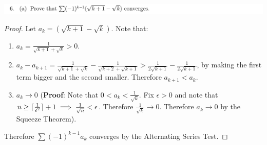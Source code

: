 \documentclass[12pt]{article}
\begin{document}
\newpage
\subsection{}
\begin{mdframed}
\includegraphics[width=400pt]{img/analysis--oxford-M2-I-5-6-a.png}
\end{mdframed}

\begin{proof}
  Let $a_k = (\sqrt{k+1} - \sqrt{k})$. Note that:

  \begin{enumerate}[label=(\roman*)]
  \item $a_k = \frac{1}{\sqrt{k+1} + \sqrt{k}} > 0$.
  \item
    $a_k - a_{k+1} = \frac{1}{\sqrt{k+1} + \sqrt{k}} - \frac{1}{\sqrt{k+2} + \sqrt{k + 1}} >
    \frac{1}{2\sqrt{k+1}} - \frac{1}{2\sqrt{k+1}}$, by making the first term bigger and the second
    smaller. Therefore $a_{k+1} < a_k$.
  \item $a_k \to 0$ ({\bf Proof}: Note that $0 < a_k < \frac{1}{\sqrt{k}}$. Fix $\epsilon > 0$ and
    note that $n \geq \lceil\frac{1}{\epsilon^2}\rceil + 1 \implies \frac{1}{\sqrt{n}} <
    \epsilon$. Therefore $\frac{1}{\sqrt{k}} \to 0$. Therefore $a_k \to 0$ by the Squeeze Theorem).
  \end{enumerate}
  Therefore $\sum (-1)^{k-1}a_k$ converges by the Alternating Series Test.
\end{proof}
\end{document}
